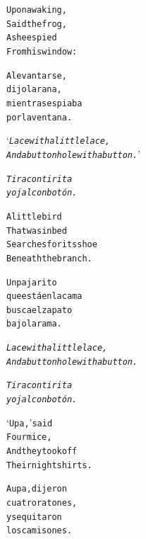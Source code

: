 \documentclass[11pt,a4paper]{article}
\begin{document}
\begin{parcolumns}{2}

\colchunk
{
\begin{alltt}\normalfont
Upon awaking,
Said the frog,
As he espied
From his window:
\end{alltt}
}

\colchunk
{
\begin{alltt}\normalfont
A levantarse,
dijo la rana,
mientras espiaba
por la ventana.
\end{alltt}
}

\colplacechunks

\colchunk
{
\begin{alltt}\normalfont
‘\emph{Lace with a little lace,
And a buttonhole with a button.}’
\end{alltt}
}

\colchunk
{
\begin{alltt}\normalfont
\emph{Tira con tirita
y ojal con botón.}
\end{alltt}
}

\colplacechunks

\colchunk
{
\begin{alltt}\normalfont
A little bird
That was in bed
Searches for its shoe
Beneath the branch.
\end{alltt}
}

\colchunk
{
\begin{alltt}\normalfont
Un pajarito
que está en la cama
busca el zapato
bajo la rama.
\end{alltt}
}

\colplacechunks

\colchunk
{
\begin{alltt}\normalfont
\emph{Lace with a little lace,
And a buttonhole with a button.}
\end{alltt}
}

\colchunk
{
\begin{alltt}\normalfont
\emph{Tira con tirita
y ojal con botón.}
\end{alltt}
}

\colplacechunks

\colchunk
{
\begin{alltt}\normalfont
‘Upa,’ said
Four mice,
And they took off
Their nightshirts.
\end{alltt}
}

\colchunk
{
\begin{alltt}\normalfont
Aupa, dijeron
cuatro ratones,
y se quitaron
los camisones.
\end{alltt}
}


\end{parcolumns}
\end{document}
